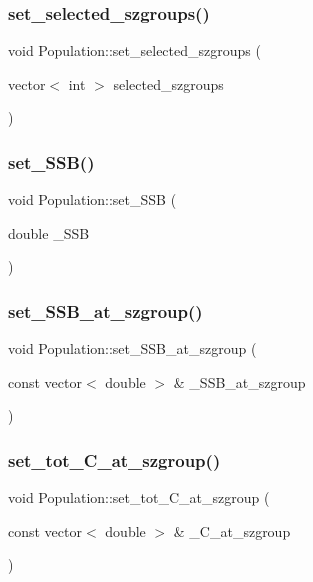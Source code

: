 \subsubsection{\texorpdfstring{set\_selected\_szgroups()}{set\_selected\_szgroups()}}
{\footnotesize\ttfamily void Population\+::set\+\_\+selected\+\_\+szgroups (\begin{DoxyParamCaption}\item[{vector$<$ int $>$}]{selected\+\_\+szgroups }\end{DoxyParamCaption})}

\mbox{\label{class_population_a806afc3b2b1d3abbcddafe0d2df2822e}} 
\subsubsection{\texorpdfstring{set\_SSB()}{set\_SSB()}}
{\footnotesize\ttfamily void Population\+::set\+\_\+\+S\+SB (\begin{DoxyParamCaption}\item[{double}]{\+\_\+\+S\+SB }\end{DoxyParamCaption})}

\mbox{\label{class_population_ab3a76f6f7cd4ba9424c761a675fbd9ab}} 
\subsubsection{\texorpdfstring{set\_SSB\_at\_szgroup()}{set\_SSB\_at\_szgroup()}}
{\footnotesize\ttfamily void Population\+::set\+\_\+\+S\+S\+B\+\_\+at\+\_\+szgroup (\begin{DoxyParamCaption}\item[{const vector$<$ double $>$ \&}]{\+\_\+\+S\+S\+B\+\_\+at\+\_\+szgroup }\end{DoxyParamCaption})}

\mbox{\label{class_population_a35ab8cd314f77601b3f7fa0a7112a1c3}} 
\subsubsection{\texorpdfstring{set\_tot\_C\_at\_szgroup()}{set\_tot\_C\_at\_szgroup()}}
{\footnotesize\ttfamily void Population\+::set\+\_\+tot\+\_\+\+C\+\_\+at\+\_\+szgroup (\begin{DoxyParamCaption}\item[{const vector$<$ double $>$ \&}]{\+\_\+\+C\+\_\+at\+\_\+szgroup }\end{DoxyParamCaption})}

